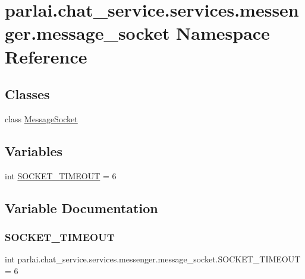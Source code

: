 \hypertarget{namespaceparlai_1_1chat__service_1_1services_1_1messenger_1_1message__socket}{}\section{parlai.\+chat\+\_\+service.\+services.\+messenger.\+message\+\_\+socket Namespace Reference}
\label{namespaceparlai_1_1chat__service_1_1services_1_1messenger_1_1message__socket}
\subsection*{Classes}
\begin{DoxyCompactItemize}
\item 
class \hyperlink{classparlai_1_1chat__service_1_1services_1_1messenger_1_1message__socket_1_1MessageSocket}{Message\+Socket}
\end{DoxyCompactItemize}
\subsection*{Variables}
\begin{DoxyCompactItemize}
\item 
int \hyperlink{namespaceparlai_1_1chat__service_1_1services_1_1messenger_1_1message__socket_a92bb5774ff4a58fb856c8fd1e6bc2dc4}{S\+O\+C\+K\+E\+T\+\_\+\+T\+I\+M\+E\+O\+UT} = 6
\end{DoxyCompactItemize}


\subsection{Variable Documentation}
\mbox{\label{namespaceparlai_1_1chat__service_1_1services_1_1messenger_1_1message__socket_a92bb5774ff4a58fb856c8fd1e6bc2dc4}} 
\subsubsection{\texorpdfstring{S\+O\+C\+K\+E\+T\+\_\+\+T\+I\+M\+E\+O\+UT}{SOCKET\_TIMEOUT}}
{\footnotesize\ttfamily int parlai.\+chat\+\_\+service.\+services.\+messenger.\+message\+\_\+socket.\+S\+O\+C\+K\+E\+T\+\_\+\+T\+I\+M\+E\+O\+UT = 6}


